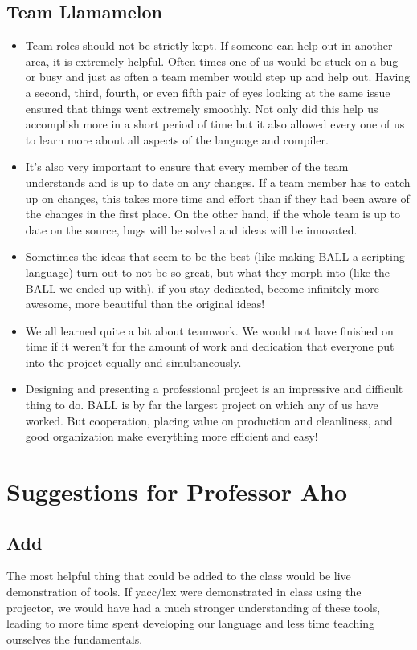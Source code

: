 \subsection{Team Llamamelon}
\begin{itemize}
\item Team roles should not be strictly kept.  If someone can help out
  in another area, it is extremely helpful.  Often times one of us
  would be stuck on a bug or busy and just as often a team member
  would step up and help out. Having a second, third, fourth, or even
  fifth pair of eyes looking at the same issue ensured that things
  went extremely smoothly.  Not only did this help us accomplish more
  in a short period of time but it also allowed every one of us to
  learn more about all aspects of the language and compiler.
\item It's also very important to ensure that every member of the team
  understands and is up to date on any changes. If a team member has
  to catch up on changes, this takes more time and effort than if they
  had been aware of the changes in the first place. On the other hand,
  if the whole team is up to date on the source, bugs will be solved
  and ideas will be innovated.
\item Sometimes the ideas that seem to be the best (like making BALL a
  scripting language) turn out to not be so great, but what they morph
  into (like the BALL we ended up with), if you stay dedicated, become
  infinitely more awesome, more beautiful than the original ideas!
\item We all learned quite a bit about teamwork. We would not have
  finished on time if it weren't for the amount of work and dedication
  that everyone put into the project equally and simultaneously.
\item Designing and presenting a professional project is an impressive
  and difficult thing to do. BALL is by far the largest project on
  which any of us have worked. But cooperation, placing value on
  production and cleanliness, and good organization make everything
  more efficient and easy!
\end{itemize}

\section{Suggestions for Professor Aho}
\subsection{Add}
The most helpful thing that could be added to the class would be live
demonstration of tools. If yacc/lex were demonstrated in class using
the projector, we would have had a much stronger understanding of
these tools, leading to more time spent developing our language and
less time teaching ourselves the fundamentals.
